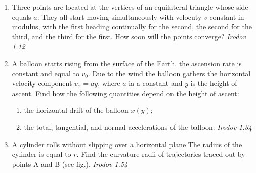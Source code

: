 \begin{enumerate}

\item Three points are located at the vertices of an equilateral triangle whose side equals $a$. They all start moving simultaneously with velocuty $v$ constant in modulus, with the first heading continually for the second, the second for the third, and the third for the first. How soon will the points converge? \hfill \textsl{Irodov 1.12}

\item A balloon starts rising from the surface of the Earth. the ascension rate is constant and equal to $v_0$. Due to the wind the balloon gathers the horizontal velocity component $v_x=ay$, where $a$ ia a constant and $y$ is the height of ascent. Find how the following quantities depend on the height of ascent:
\begin{enumerate}
\item the horizontal drift of the balloon $x(y)$;
\item the total, tangential, and normal accelerations of the balloon. \hfill \textsl{Irodov 1.34}
\end{enumerate}

\item A cylinder rolls without slipping over a horizontal plane The radius of the cylinder is equal to $r$. Find the curvature radii of trajectories traced out by points A and B (see fig.). \hfill \textsl{Irodov 1.54}


\end{enumerate}
